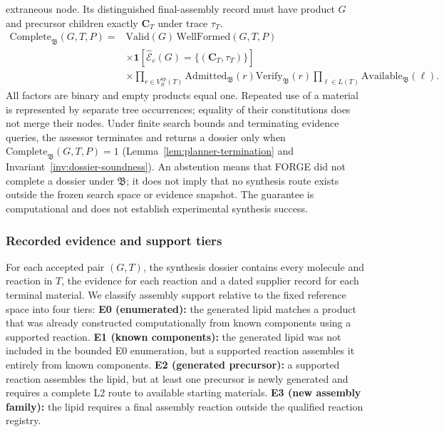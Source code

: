 extraneous node. Its distinguished final-assembly record must have product $G$ and precursor
children exactly $\mathbf C_T$ under trace $\tau_T$.
\begin{equation}
\begin{aligned}
    \mathrm{Complete}_{\mathfrak B}(G,T,P)
    ={}&\mathrm{Valid}(G)\,\mathrm{WellFormed}(G,T,P)\\
    &\times\mathbf1\!\left[\widehat{\mathcal E}_c(G)=\{(\mathbf C_T,\tau_T)\}\right]\\
    &\times\prod_{r\in V_R^{\mathrm{up}}(T)}
    \mathrm{Admitted}_{\mathfrak B}(r)\mathrm{Verify}_{\mathfrak B}(r)
    \prod_{\ell\in L(T)}\mathrm{Available}_{\mathfrak B}(\ell).
\end{aligned}
\end{equation}
All factors are binary and empty products equal one. Repeated use of a material is represented by
separate tree occurrences; equality of their constitutions does not merge their nodes.
Under finite search bounds and terminating evidence queries, the assessor terminates and returns a
dossier only when $\mathrm{Complete}_{\mathfrak B}(G,T,P)=1$
(Lemma~\ref{lem:planner-termination} and Invariant~\ref{inv:dossier-soundness}).
An abstention means that FORGE did not complete a dossier under $\mathfrak B$; it does not imply that
no synthesis route exists outside the frozen search space or evidence snapshot.
The guarantee is computational and does not establish experimental synthesis success.

\subsubsection{Recorded evidence and support tiers}

For each accepted pair $(G,T)$, the synthesis dossier contains every molecule and reaction in $T$,
the evidence for each reaction and a dated supplier record for each terminal material.
We classify assembly support relative to the fixed reference space into four tiers:
\textbf{E0 (enumerated):} the generated lipid matches a product that was already constructed
computationally from known components using a supported reaction.
\textbf{E1 (known components):} the generated lipid was not included in the bounded E0 enumeration,
but a supported reaction assembles it entirely from known components.
\textbf{E2 (generated precursor):} a supported reaction assembles the lipid, but at least one
precursor is newly generated and requires a complete L2 route to available starting materials.
\textbf{E3 (new assembly family):} the lipid requires a final assembly reaction outside the
qualified reaction registry.

